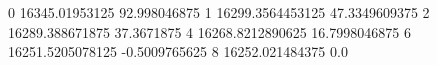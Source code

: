 0 16345.01953125 92.998046875
1 16299.3564453125 47.3349609375
2 16289.388671875 37.3671875
4 16268.8212890625 16.7998046875
6 16251.5205078125 -0.5009765625
8 16252.021484375 0.0
